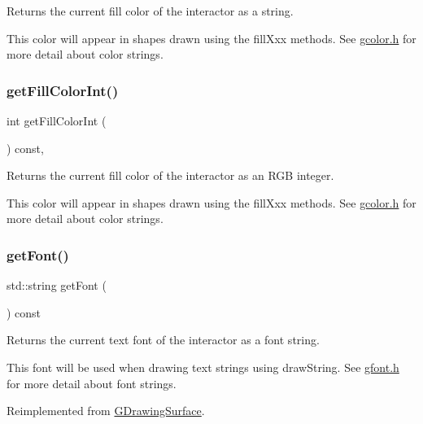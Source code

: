 Returns the current fill color of the interactor as a string. 

This color will appear in shapes drawn using the fill\+Xxx methods. See \mbox{\hyperlink{gcolor_8h_source}{gcolor.\+h}} for more detail about color strings. \mbox{\label{classGDrawingSurface_a88f4508d9271c4b5f5b5d6b780f223d0}} 
\subsubsection{\texorpdfstring{get\+Fill\+Color\+Int()}{getFillColorInt()}}
{\footnotesize\ttfamily int get\+Fill\+Color\+Int (\begin{DoxyParamCaption}{ }\end{DoxyParamCaption}) const\hspace{0.3cm}{\ttfamily [virtual]}, {\ttfamily [inherited]}}



Returns the current fill color of the interactor as an R\+GB integer. 

This color will appear in shapes drawn using the fill\+Xxx methods. See \mbox{\hyperlink{gcolor_8h_source}{gcolor.\+h}} for more detail about color strings. \mbox{\label{classGCanvas_a24420d98f18927d2c201a3ab55ffdcec}} 
\subsubsection{\texorpdfstring{get\+Font()}{getFont()}}
{\footnotesize\ttfamily std\+::string get\+Font (\begin{DoxyParamCaption}{ }\end{DoxyParamCaption}) const\hspace{0.3cm}{\ttfamily [virtual]}}



Returns the current text font of the interactor as a font string. 

This font will be used when drawing text strings using draw\+String. See \mbox{\hyperlink{gfont_8h_source}{gfont.\+h}} for more detail about font strings. 

Reimplemented from \mbox{\hyperlink{classGDrawingSurface_a894a5502900794eeb27d084c21f1d77d}{G\+Drawing\+Surface}}.

